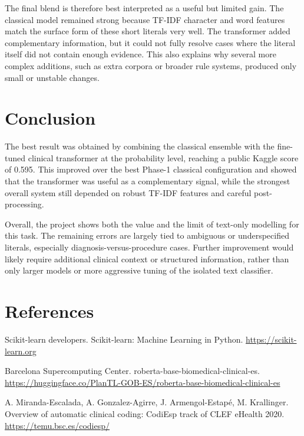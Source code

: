 \documentclass[9pt,a4paper,twoside]{utils/tau-class/tau}
\begin{document}
The final blend is therefore best interpreted as a useful but limited gain. The classical model remained strong because TF-IDF character and word features match the surface form of these short literals very well. The transformer added complementary information, but it could not fully resolve cases where the literal itself did not contain enough evidence. This also explains why several more complex additions, such as extra corpora or broader rule systems, produced only small or unstable changes.

\section{Conclusion}

The best result was obtained by combining the classical ensemble with the fine-tuned clinical transformer at the probability level, reaching a public Kaggle score of 0.595. This improved over the best Phase-1 classical configuration and showed that the transformer was useful as a complementary signal, while the strongest overall system still depended on robust TF-IDF features and careful post-processing.

Overall, the project shows both the value and the limit of text-only modelling for this task. The remaining errors are largely tied to ambiguous or underspecified literals, especially diagnosis-versus-procedure cases. Further improvement would likely require additional clinical context or structured information, rather than only larger models or more aggressive tuning of the isolated text classifier.

\section*{References}

\begin{enumerate}[label={[\arabic*]},leftmargin=*]
    \item Scikit-learn developers. Scikit-learn: Machine Learning in Python. \url{https://scikit-learn.org}
    \item Barcelona Supercomputing Center. roberta-base-biomedical-clinical-es. \url{https://huggingface.co/PlanTL-GOB-ES/roberta-base-biomedical-clinical-es}
    \item A. Miranda-Escalada, A. Gonzalez-Agirre, J. Armengol-Estap\'e, M. Krallinger. Overview of automatic clinical coding: CodiEsp track of CLEF eHealth 2020. \url{https://temu.bsc.es/codiesp/}
\end{enumerate}

\end{document}
